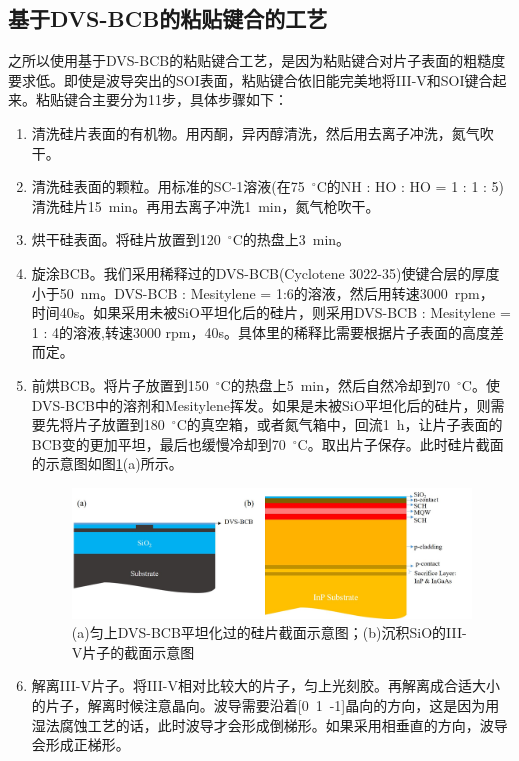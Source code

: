 \subsection{基于DVS-BCB的粘贴键合的工艺}
之所以使用基于DVS-BCB的粘贴键合工艺，是因为粘贴键合对片子表面的粗糙度要求低。即使是波导突出的SOI表面，粘贴键合依旧能完美地将III-V和SOI键合起来。粘贴键合主要分为11步，具体步骤如下：
\begin{enumerate}[(1)]
	\item 清洗硅片表面的有机物。用丙酮，异丙醇清洗，然后用去离子冲洗，氮气吹干。
	\item 清洗硅表面的颗粒。用标准的SC-1溶液(在75~$^{\circ}$C的NH : HO : HO = 1 : 1 : 5)清洗硅片15~min。再用去离子冲洗1~min，氮气枪吹干。
	\item 烘干硅表面。将硅片放置到120~$^{\circ}$C的热盘上3~min。
	\item 旋涂BCB。我们采用稀释过的DVS-BCB(Cyclotene 3022-35)\cite{dvsbcb35}使键合层的厚度小于50~nm\cite{keyvaninia2013ultra}。DVS-BCB : Mesitylene = 1:6的溶液，然后用转速3000~rpm， 时间40s。如果采用未被SiO平坦化后的硅片，则采用DVS-BCB : Mesitylene = 1 : 4的溶液,转速3000 rpm，40s。具体里的稀释比需要根据片子表面的高度差而定。
	\item 前烘BCB。将片子放置到150~$^{\circ}$C的热盘上5~min，然后自然冷却到70~$^{\circ}$C。使DVS-BCB中的溶剂和Mesitylene挥发。如果是未被SiO平坦化后的硅片，则需要先将片子放置到180~$^{\circ}$C的真空箱，或者氮气箱中，回流1~h，让片子表面的BCB变的更加平坦，最后也缓慢冷却到70~$^{\circ}$C。取出片子保存。此时硅片截面的示意图如图\ref{chapt4_bonding_diagram1}(a)所示。
	\begin{figure}[htb]
		\centering
		\includegraphics[width=14cm]{./Pictures/chapt4_bonding_diagram1.jpg}
		\caption{(a)匀上DVS-BCB平坦化过的硅片截面示意图；(b)沉积SiO的III-V片子的截面示意图}
		\label{chapt4_bonding_diagram1}
	\end{figure}
	\item 解离III-V片子。将III-V相对比较大的片子，匀上光刻胶。再解离成合适大小的片子，解离时候注意晶向。波导需要沿着[0~1~-1]晶向的方向，这是因为用湿法腐蚀工艺的话，此时波导才会形成倒梯形。如果采用相垂直的方向，波导会形成正梯形。

\end{enumerate}
